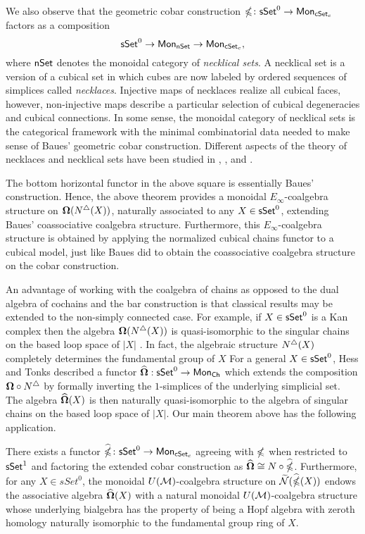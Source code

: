 We also observe that the geometric cobar construction $\mathbb{\Omega} \colon \mathsf{sSet}^0 \to \mathsf{Mon}_{\mathsf{cSet}_c}$ factors as a composition
$$\mathsf{sSet}^0 \to \mathsf{Mon}_{\mathsf{nSet}} \to \mathsf{Mon}_{\mathsf{cSet}_c},$$
where $\mathsf{nSet}$ denotes the monoidal category of \textit{necklical sets}. A necklical set is a version of a cubical set in which cubes are now labeled by ordered sequences of simplices called \textit{necklaces}. Injective maps of necklaces realize all cubical faces, however, non-injective maps describe a particular selection of cubical degeneracies and cubical connections. In some sense, the monoidal category of necklical sets is the categorical framework with the minimal combinatorial data needed to make sense of Baues' geometric cobar construction. Different aspects of the theory of necklaces and necklical sets have been studied in \cite{Dugger, Spivak}, \cite{Kaufmann, Galvez, Tonks}, and \cite{Rivera-Zeinalian}.


The bottom horizontal functor in the above square is essentially Baues' construction. Hence, the above theorem provides a monoidal $E_{\infty}$-coalgebra structure on $\mathbf{\Omega}(N^{\triangle} (X))$, naturally associated to any $X \in \mathsf{sSet}^0$, extending Baues' coassociative coalgebra structure. Furthermore, this $E_{\infty}$-coalgebra structure is obtained by applying the normalized cubical chains functor to a cubical model, just like Baues did to obtain the coassociative coalgebra structure on the cobar construction. 

An advantage of working with the coalgebra of chains as opposed to the dual algebra of cochains and the bar construction is that classical results may be extended to the non-simply connected case. For example, if $X \in \mathsf{sSet}^0$ is a Kan complex then the algebra $\mathbf{\Omega}(N^{\triangle}(X))$ is quasi-isomorphic to the singular chains on the based loop space of $|X|$ \cite{Rivera-Zeinalian}. In fact, the algebraic structure $N^{\triangle} (X)$ completely determines the fundamental group of $X$ \cite{Rivera- Zeinalian Fundamenta Math.}  For a general $X \in \mathsf{sSet}^0$, Hess and Tonks described a functor $\widehat{\mathbf{\Omega}}: \mathsf{sSet}^0 \to \mathsf{Mon}_{\mathsf{Ch}}$ which extends the composition $\mathbf{\Omega} \circ N^{\triangle}$ by formally inverting the $1$-simplices of the underlying simplicial set. The algebra $\widehat{\mathbf{\Omega}}(X)$ is then naturally quasi-isomorphic to the algebra of singular chains on the based loop space of $|X|$. Our main theorem above has the following application. 


\begin{theorem}
There exists a functor $\widehat{\mathbb{\Omega}} \colon \mathsf{sSet}^0 \to \mathsf{Mon}_{\mathsf{cSet}_c}$ agreeing with $\mathbb{\Omega}$ when restricted to $\mathsf{sSet}^1$ and factoring the extended cobar construction as $\widehat{\mathbf{\Omega}} \cong N \circ \widehat{\mathbb{\Omega}}$. Furthermore, for any $X \in sSet^0$, the monoidal $U(\mathcal{M})$-coalgebra structure on $\widetilde{\mathcal{N}}(\widehat{\mathbb{\Omega}}(X))$ endows the associative algebra $\widehat{\mathbf{\Omega}}(X)$ with a natural monoidal $U(\mathcal{M})$-coalgebra structure whose underlying bialgebra has the property of being a Hopf algebra with zeroth homology naturally isomorphic to the fundamental group ring of $X$.  
\end{theorem}

